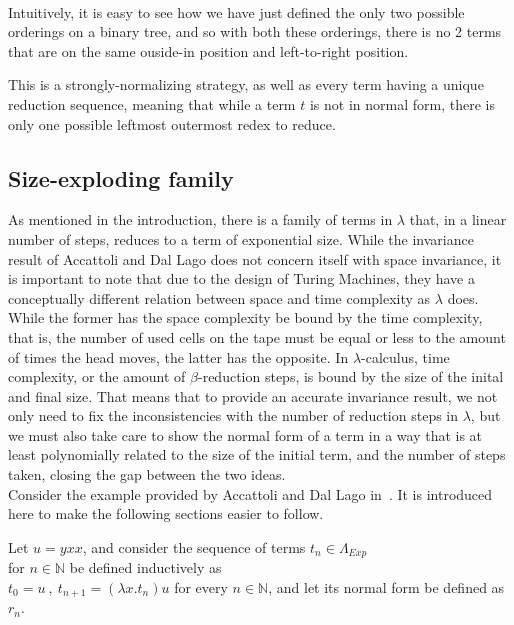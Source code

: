 \documentclass[11pt]{article}
\begin{document}
\\
Intuitively, it is easy to see how we have just defined the only two possible orderings on a binary tree, and so with both these orderings, there is no 2 terms that are on the same ouside-in position and left-to-right position.

This is a strongly-normalizing strategy, as well as every term having a unique reduction sequence, meaning that while a term $t$ is not in normal form, there is only one possible leftmost outermost redex to reduce.
\subsection{Size-exploding family}
As mentioned in the introduction, there is a family of terms in $\lambda$ that, in a linear number of steps, reduces to a term of exponential size. While the invariance result of Accattoli and Dal Lago does not concern itself with space invariance, it is important to note that due to the design of Turing Machines, they have a conceptually different relation between space and time complexity as $\lambda$ does. While the former has the space complexity be bound by the time complexity, that is, the number of used cells on the tape must be equal or less to the amount of times the head moves, the latter has the opposite. In $\lambda$-calculus, time complexity, or the amount of $\beta$-reduction steps, is bound by the size of the inital and final size. That means that to provide an accurate invariance result, we not only need to fix the inconsistencies with the number of reduction steps in $\lambda$, but we must also take care to show the normal form of a term in a way that is at least polynomially related to the size of the initial term, and the number of steps taken, closing the gap between the two ideas.
\\ 
Consider the example provided by Accattoli and Dal Lago in~\cite{beta-invariance}. It is introduced here to make the following sections easier to follow.
\begin{center}
  Let $u = yxx$, and consider the sequence of terms $t_{n} \in \Lambda_{Exp}$  \\ for $n \in \mathbb{N}$ be defined inductively as \\
  $t_{0} = u \ , \ t_{n + 1} = (\lambda x.t_{n})u$ for every $n \in \mathbb{N}$, and let its normal form be defined as $r_n$.
\end{center}
\end{document}
